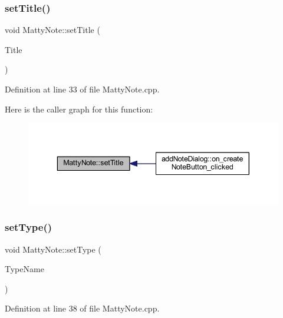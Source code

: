 \subsubsection{\texorpdfstring{set\+Title()}{setTitle()}}
{\footnotesize\ttfamily void Matty\+Note\+::set\+Title (\begin{DoxyParamCaption}\item[{const Q\+String \&}]{Title }\end{DoxyParamCaption})}



Definition at line 33 of file Matty\+Note.\+cpp.

Here is the caller graph for this function\+:
\nopagebreak
\begin{figure}[H]
\begin{center}
\leavevmode
\includegraphics[width=343pt]{classMattyNote_af7909f64608b020b501019cf29796eb0_icgraph}
\end{center}
\end{figure}
\hypertarget{classMattyNote_ac9171fd4faaf0c286c9315a0b4ef4560}{}\label{classMattyNote_ac9171fd4faaf0c286c9315a0b4ef4560} 
\subsubsection{\texorpdfstring{set\+Type()}{setType()}\hspace{0.1cm}{\footnotesize\ttfamily [1/2]}}
{\footnotesize\ttfamily void Matty\+Note\+::set\+Type (\begin{DoxyParamCaption}\item[{const Q\+String \&}]{Type\+Name }\end{DoxyParamCaption})}



Definition at line 38 of file Matty\+Note.\+cpp.

